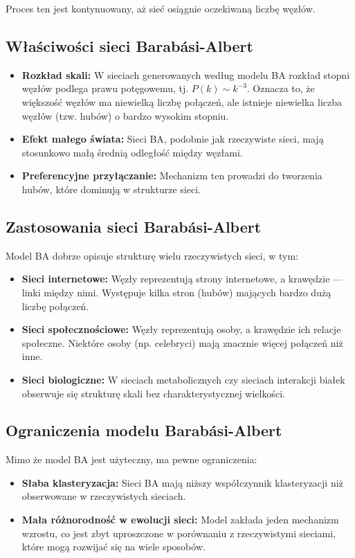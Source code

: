 Proces ten jest kontynuowany, aż sieć osiągnie oczekiwaną liczbę węzłów.

\subsection{Właściwości sieci Barabási-Albert}
\begin{itemize}
    \item \textbf{Rozkład skali:} W sieciach generowanych według modelu BA rozkład stopni węzłów podlega prawu potęgowemu, tj. $P(k) \sim k^{-3}$.
          Oznacza to, że większość węzłów ma niewielką liczbę połączeń, ale istnieje niewielka liczba węzłów (tzw. hubów) o bardzo wysokim stopniu.
    \item \textbf{Efekt małego świata:} Sieci BA, podobnie jak rzeczywiste sieci, mają stosunkowo małą średnią odległość między węzłami.
    \item \textbf{Preferencyjne przyłączanie:} Mechanizm ten prowadzi do tworzenia hubów, które dominują w strukturze sieci.
\end{itemize}

\subsection{Zastosowania sieci Barabási-Albert}
Model BA dobrze opisuje strukturę wielu rzeczywistych sieci, w tym:
\begin{itemize}
    \item \textbf{Sieci internetowe:} Węzły reprezentują strony internetowe, a krawędzie — linki między nimi. Występuje kilka stron (hubów) mających bardzo dużą liczbę połączeń.
    \item \textbf{Sieci społecznościowe:} Węzły reprezentują osoby, a krawędzie ich relacje społeczne. Niektóre osoby (np. celebryci) mają znacznie więcej połączeń niż inne.
    \item \textbf{Sieci biologiczne:} W sieciach metabolicznych czy sieciach interakcji białek obserwuje się strukturę skali bez charakterystycznej wielkości.
\end{itemize}

\subsection{Ograniczenia modelu Barabási-Albert}
Mimo że model BA jest użyteczny, ma pewne ograniczenia:
\begin{itemize}
    \item \textbf{Słaba klasteryzacja:} Sieci BA mają niższy współczynnik klasteryzacji niż obserwowane w rzeczywistych sieciach.
    \item \textbf{Mała różnorodność w ewolucji sieci:} Model zakłada jeden mechanizm wzrostu, co jest zbyt uproszczone w porównaniu z rzeczywistymi sieciami, które mogą rozwijać się na wiele sposobów.
\end{itemize}
